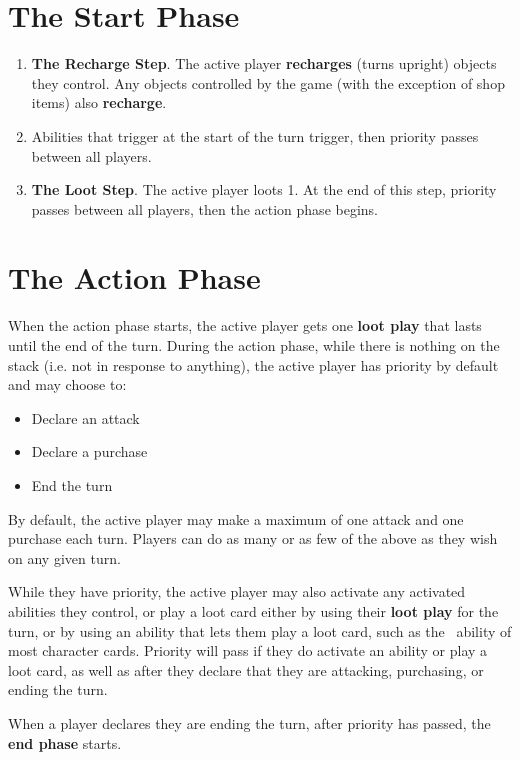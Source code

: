 \documentclass[
  fontsize=10pt,
  paper=a5,
  version=last,
  chapterprefix=true,
  bindingoffset=5mm,
  ]{scrbook}
\newcommand*{\inlineicon}[1]{%
    \raisebox{-.3\baselineskip}{%
        \smash{%
            \texttt{[image: \#1]}%
        }%
    }%
}
\newcommand{\tap}{\inlineicon{./assets/ms-tap.png}}
\begin{document}
    \section{The Start Phase}
    \begin{enumerate}
        \item \textbf{The Recharge Step}. The active player \textbf{recharges} (turns upright) objects they control. Any objects controlled by the game (with the exception of shop items) also \textbf{recharge}.
        \item Abilities that trigger at the start of the turn trigger, then priority passes between all players.
        \item \textbf{The Loot Step}. The active player loots 1. At the end of this step, priority passes between all players, then the action phase begins.
    \end{enumerate}

    \section{The Action Phase}
    When the action phase starts, the active player gets one \textbf{loot play} that lasts until the end of the turn. During the action phase, while there is nothing on the stack (i.e. not in response to anything), the active player has priority by default and may choose to:
    \begin{itemize}
        \item Declare an attack
        \item Declare a purchase
        \item End the turn
    \end{itemize}
    By default, the active player may make a maximum of one attack and one purchase each turn.  Players can do as many or as few of the above as they wish on any given turn.

    While they have priority, the active player may also activate any activated abilities they control, or play a loot card either by using their \textbf{loot play} for the turn, or by using an ability that lets them play a loot card, such as the \tap\ ability of most character cards. Priority will pass if they do activate an ability or play a loot card, as well as after they declare that they are attacking, purchasing, or ending the turn.

    When a player declares they are ending the turn, after priority has passed, the \textbf{end phase} starts.
\end{document}
